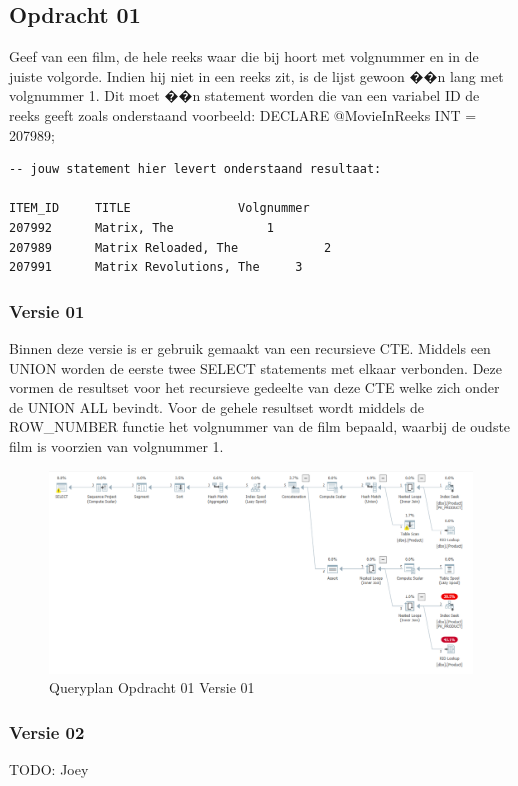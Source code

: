\subsection{Opdracht 01}

Geef van een film, de hele reeks waar die bij hoort met volgnummer en in de juiste volgorde.
Indien hij niet in een reeks zit, is de lijst gewoon ��n lang met volgnummer 1.
Dit moet ��n statement worden die van een variabel ID de reeks geeft zoals onderstaand voorbeeld:
DECLARE @MovieInReeks INT = 207989;


\begin{lstlisting}
-- jouw statement hier levert onderstaand resultaat:

ITEM_ID		TITLE				Volgnummer
207992		Matrix, The				1
207989		Matrix Reloaded, The			2
207991		Matrix Revolutions, The		3
\end{lstlisting}

\subsubsection{Versie 01}

    Binnen deze versie is er gebruik gemaakt van een recursieve CTE. Middels een UNION worden de eerste twee SELECT statements
    met elkaar verbonden. Deze vormen de resultset voor het recursieve gedeelte van deze CTE welke zich onder de UNION ALL bevindt.
    Voor de gehele resultset wordt middels de ROW_NUMBER functie het volgnummer van de film bepaald, waarbij de oudste film is voorzien
    van volgnummer 1.


\begin{figure}
    \centering
    \includegraphics[width=1\textwidth]{image/marc/opdracht-01.PNG}
    \caption{Queryplan Opdracht 01 Versie 01}
\end{figure}

\subsubsection{Versie 02}
TODO: Joey

